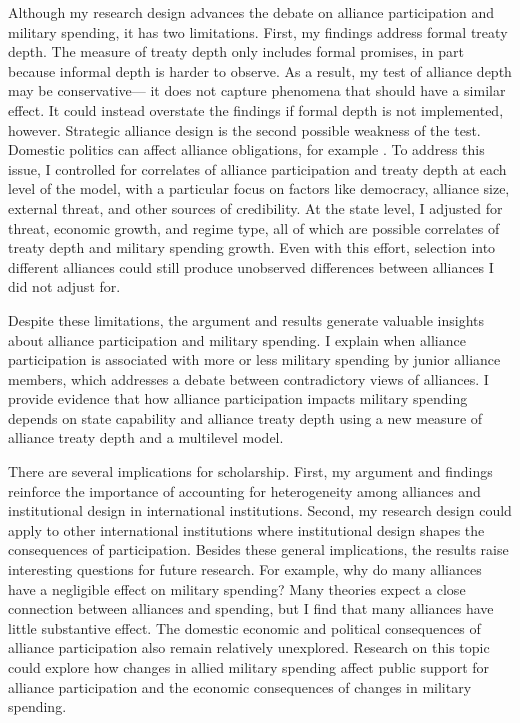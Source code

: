 \documentclass[12pt]{article}
\begin{document}
Although my research design advances the debate on alliance participation and military spending, it has two limitations. 
First, my findings address formal treaty depth. 
The measure of treaty depth only includes formal promises, in part because informal depth is harder to observe. 
As a result, my test of alliance depth may be conservative--- it does not capture phenomena that should have a similar effect. 
It could instead overstate the findings if formal depth is not implemented, however. 
Strategic alliance design is the second possible weakness of the test. 
Domestic politics can affect alliance obligations, for example \citep{Davis2004, Chibaetal2015}.   
To address this issue, I controlled for correlates of alliance participation and treaty depth at each level of the model, with a particular focus on factors like democracy, alliance size, external threat, and other sources of credibility.
At the state level, I adjusted for threat, economic growth, and regime type, all of which are possible correlates of treaty depth and military spending growth. 
Even with this effort, selection into different alliances could still produce unobserved differences between alliances I did not adjust for. 


Despite these limitations, the argument and results generate valuable insights about alliance participation and military spending. 
I explain when alliance participation is associated with more or less military spending by junior alliance members, which addresses a debate between contradictory views of alliances.  
I provide evidence that how alliance participation impacts military spending depends on state capability and alliance treaty depth using a new measure of alliance treaty depth and a multilevel model. 


There are several implications for scholarship. 
First, my argument and findings reinforce the importance of accounting for heterogeneity among alliances and institutional design in international institutions.
Second, my research design could apply to other international institutions where institutional design shapes the consequences of participation.
Besides these general implications, the results raise interesting questions for future research. 
For example, why do many alliances have a negligible effect on military spending? 
Many theories expect a close connection between alliances and spending, but I find that many alliances have little substantive effect.
The domestic economic and political consequences of alliance participation also remain relatively unexplored.
Research on this topic could explore how changes in allied military spending affect public support for alliance participation and the economic consequences of changes in military spending.  
\end{document}
